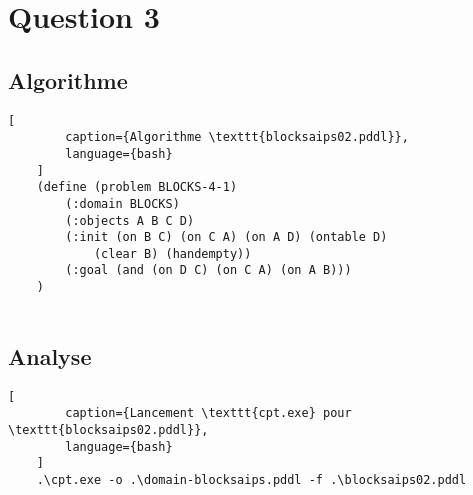 \documentclass[../CSC_5RO16_TA_TP5.tex]{subfiles}
\begin{document}
\section{Question 3}
% 

\subsection{Algorithme}

\begin{scriptsize}\mycode
    \begin{lstlisting}[
        caption={Algorithme \texttt{blocksaips02.pddl}},
        language={bash}
    ]
    (define (problem BLOCKS-4-1)
        (:domain BLOCKS)
        (:objects A B C D)
        (:init (on B C) (on C A) (on A D) (ontable D)
            (clear B) (handempty))
        (:goal (and (on D C) (on C A) (on A B)))
    )
  
    \end{lstlisting}
\end{scriptsize}

\subsection{Analyse}

\begin{scriptsize}\mycode
	\begin{lstlisting}[
        caption={Lancement \texttt{cpt.exe} pour \texttt{blocksaips02.pddl}},
        language={bash}
    ]
    .\cpt.exe -o .\domain-blocksaips.pddl -f .\blocksaips02.pddl
    \end{lstlisting}
\end{scriptsize}
\end{document}
